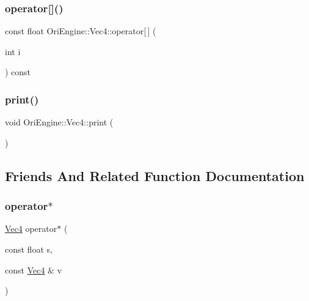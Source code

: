\subsubsection{\texorpdfstring{operator[]()}{operator[]()}\hspace{0.1cm}{\footnotesize\ttfamily [2/2]}}
{\footnotesize\ttfamily const float Ori\+Engine\+::\+Vec4\+::operator\mbox{[}$\,$\mbox{]} (\begin{DoxyParamCaption}\item[{int}]{i }\end{DoxyParamCaption}) const\hspace{0.3cm}{\ttfamily [inline]}}

\hypertarget{struct_ori_engine_1_1_vec4_a3ed05625c5422292da6218fc6294c85c}{}\label{struct_ori_engine_1_1_vec4_a3ed05625c5422292da6218fc6294c85c} 
\subsubsection{\texorpdfstring{print()}{print()}}
{\footnotesize\ttfamily void Ori\+Engine\+::\+Vec4\+::print (\begin{DoxyParamCaption}{ }\end{DoxyParamCaption})\hspace{0.3cm}{\ttfamily [inline]}}



\subsection{Friends And Related Function Documentation}
\hypertarget{struct_ori_engine_1_1_vec4_a23071d3ed3480029acaf809bdaf37c24}{}\label{struct_ori_engine_1_1_vec4_a23071d3ed3480029acaf809bdaf37c24} 
\subsubsection{\texorpdfstring{operator$\ast$}{operator*}}
{\footnotesize\ttfamily \hyperlink{struct_ori_engine_1_1_vec4}{Vec4} operator$\ast$ (\begin{DoxyParamCaption}\item[{const float}]{s,  }\item[{const \hyperlink{struct_ori_engine_1_1_vec4}{Vec4} \&}]{v }\end{DoxyParamCaption})\hspace{0.3cm}{\ttfamily [friend]}}



